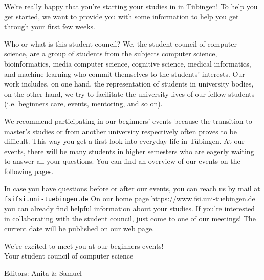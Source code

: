 \thispagestyle{firststyle}
We're really happy that you're starting your studies in \studiengang in Tübingen!
To help you get started, we want to provide you with some information to help you get through your first few weeks.

Who or what is this \glqq student council\grqq? We, the student council of computer science, are a group of students from the subjects computer science, bioinformatics, media computer science, cognitive science, medical informatics, and machine learning
who commit themselves to the students' interests. Our work includes, on one hand, the representation of students in university bodies, on the other hand, we try to facilitate the university lives of our fellow students (i.e. beginners care,
events, mentoring, and so on).

\ifmaster
    \ifml
We recommend participating in our beginners' events because the transition to master's studies or from another university respectively often proves to be difficult. This way you get a first look into everyday life in Tübingen.
    \fi
\fi
At our events, there will be many students in higher semesters who are eagerly waiting to answer all your questions. You can find an overview of our events on the following pages.

In case you have questions before or after our events, you can reach us by mail at \texttt{fsi\At fsi.uni-tuebingen.de}
On our home page
\url{https://www.fsi.uni-tuebingen.de} you can already find helpful information about your studies. If you're interested in collaborating with the student council, just come to one of our meetings! The current date will be published on our web page.

We're excited to meet you at our beginners events!\\
Your student council of computer science
\par\hfill{\footnotesize Editors: Anita \& Samuel}
\vfill

